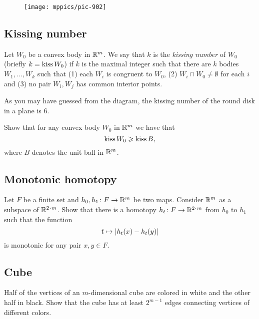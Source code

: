 {


\begin{wrapfigure}{r}{27 mm}
\vskip0mm
\centering
\texttt{[image: mppics/pic-902]}
\end{wrapfigure}

\subsection*{Kissing number\easy}\label{pr:Kissing number}


Let  $W_0$ be a convex body in $\RR^m$.
We say that $k$ is the \emph{kissing number} of $W_0$ (briefly $k=\mathop{\rm kiss}W_0$)
if $k$ is the maximal integer such that there are $k$ bodies $W_1,\dots,W_k$ such that 
(1) each $W_i$ is congruent to $W_0$,
(2) $W_i\cap W_0\not=\emptyset$ for each $i$ 
and (3) no pair $W_i,W_j$ has common interior points.

}

As you may have guessed from the diagram, the kissing number of the round disk in a plane is $6$.

\begin{pr}
Show that for any convex body $W_0$ in $\RR^m$ we have that
$$\mathop{\rm kiss}W_0\ge \mathop{\rm kiss}B,$$
where $B$ denotes the unit ball in $\RR^m$.
\end{pr}

\subsection*{Monotonic homotopy}
\label{mono-homotopy}




\begin{pr}
Let $F$ be a finite set and $h_0,h_1\: F\to\RR^m$ be two maps.
Consider $\RR^m$ as a subspace of $\RR^{2\cdot m}$.
Show that there is a homotopy  $h_t\:F\z\to\RR^{2\cdot m}$ from $h_0$ to $h_1$ such that  the function 
\[t\z\mapsto |h_t(x)-h_t(y)|\] 
is monotonic for any pair $x,y\in F$.
\end{pr}

\subsection*{Cube}\label{Cube}

\begin{pr}
Half of the vertices 
of an $m$-dimensional cube
are colored in white and the other half in black.
Show that the cube has at least $2^{m-1}$ edges connecting vertices of different colors. 
\end{pr}

